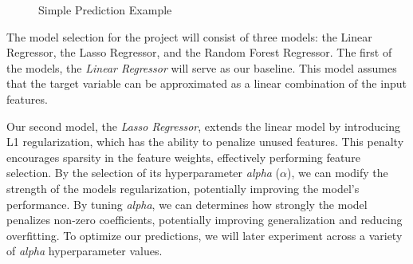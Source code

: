 \documentclass[12pt]{report} %
\begin{document}
\begin{figure}[H]
    \centering
    \caption{Simple Prediction Example}
    \label{fig:pred_example}
\end{figure}


The model selection for the project will consist of three models: the Linear Regressor, the Lasso Regressor, and the Random Forest Regressor. The first of the models, the \textit{Linear Regressor} will serve as our baseline. This model assumes that the target variable can be approximated as a linear combination of the input features.


Our second model, the \textit{Lasso Regressor}, extends the linear model by introducing L1 regularization, which has the ability to penalize unused features. This penalty encourages sparsity in the feature weights, effectively performing feature selection. By the selection of its hyperparameter \textit{alpha} ($\alpha$), we can modify the strength of the models regularization, potentially improving the model's performance. By tuning \textit{alpha}, we can determines how strongly the model penalizes non-zero coefficients, potentially improving generalization and reducing overfitting. To optimize our predictions, we will later experiment across a variety of \textit{alpha} hyperparameter values.
\end{document}

